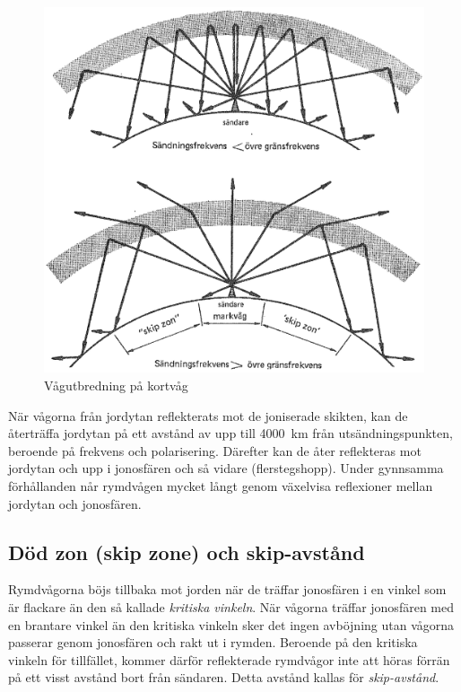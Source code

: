 \begin{figure}
  \includegraphics[width=\textwidth]{images/cropped_pdfs/bild_2_7-11.pdf}
  \caption{Vågutbredning på kortvåg}
  \label{fig:bildII7-11}
\end{figure}

När vågorna från jordytan reflekterats mot de joniserade skikten, kan
de återträffa jordytan på ett avstånd av upp till 4000~km från
utsändningspunkten, beroende på frekvens och polarisering.
Därefter kan de åter reflekteras mot jordytan och upp i jonosfären
och så vidare (flerstegshopp).
Under gynnsamma förhållanden når rymdvågen mycket långt genom växelvisa
reflexioner mellan jordytan och jonosfären.

\subsection{Död zon (skip zone) och skip-avstånd}

Rymdvågorna böjs tillbaka mot jorden när de träffar jonosfären i en
vinkel som är flackare än den så kallade \emph{kritiska vinkeln}.
När vågorna träffar jonosfären med en brantare vinkel än den kritiska vinkeln
sker det ingen avböjning utan vågorna passerar genom jonosfären och rakt ut
i rymden.
Beroende på den kritiska vinkeln för tillfället, kommer därför reflekterade
rymdvågor inte att höras förrän på ett visst avstånd bort från sändaren.
Detta avstånd kallas för \emph{skip-avstånd}.

